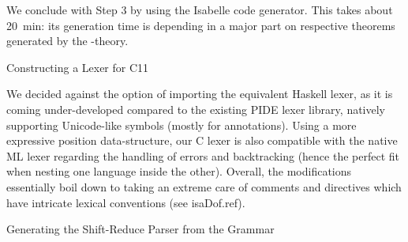 \begin{isabellebody}
{}
\isamarkuptrue%
%
\endisatagdocument
{\isafolddocument}%
%
\isadelimdocument
%
\endisadelimdocument
%
\begin{isamarkuptext}%
We conclude with Step 3 by using the Isabelle code generator. This takes about 20~min:
its generation time is depending in a major part on respective theorems generated by the
-theory.%
\end{isamarkuptext}\isamarkuptrue%
%
\begin{isamarkupsubsection*}%
[label = {lexer},type = {scholarly_paper.technical}, args={label = {lexer},type = {scholarly_paper.technical}, scholarly_paper.text_section.main_author = {@{docitem ''fred''}}, Isa_COL.text_element.level = {}, Isa_COL.text_element.referentiable = {False}, Isa_COL.text_element.variants = {{STR ''outline'', STR ''document''}}, scholarly_paper.text_section.fixme_list = {}, Isa_COL.text_element.level = {}, scholarly_paper.technical.definition_list = {}}]Constructing a Lexer for C11%
\end{isamarkupsubsection*}\isamarkuptrue%
%
\begin{isamarkuptext}%
We decided against the option of importing the equivalent Haskell lexer, as it is
coming under-developed compared to the existing PIDE lexer library, natively
supporting Unicode-like symbols (mostly for annotations). Using a more expressive position
data-structure, our C lexer is also compatible with the native ML lexer regarding the handling of
errors and backtracking (hence the perfect fit when nesting one language inside the other). Overall,
the modifications essentially boil down to taking an extreme care of comments and directives which
have intricate lexical conventions (see \csname isaDof.ref).%
\end{isamarkuptext}\isamarkuptrue%
%
\begin{isamarkupsubsection*}%
[label = {parser},type = {scholarly_paper.technical}, args={label = {parser},type = {scholarly_paper.technical}, scholarly_paper.text_section.main_author = {@{docitem ''fred''}}, Isa_COL.text_element.level = {}, Isa_COL.text_element.referentiable = {False}, Isa_COL.text_element.variants = {{STR ''outline'', STR ''document''}}, scholarly_paper.text_section.fixme_list = {}, Isa_COL.text_element.level = {}, scholarly_paper.technical.definition_list = {}}]Generating the Shift-Reduce Parser from the Grammar%
\end{isamarkupsubsection*}\isamarkuptrue%
%
\begin{isamarkuptext}%

\end{isamarkuptext}
\end{isabellebody}
